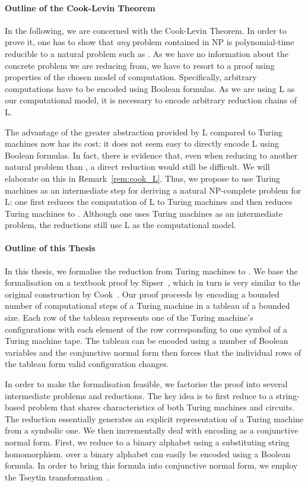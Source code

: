 \paragraph{Outline of the Cook-Levin Theorem}
In the following, we are concerned with the Cook-Levin Theorem.
In order to prove it, one has to show that \emph{any} problem contained in NP is polynomial-time reducible to a natural problem such as \SAT{}. 
As we have no information about the concrete problem we are reducing from, we have to resort to a proof using properties of the chosen model of computation. 
Specifically, arbitrary computations have to be encoded using Boolean formulas.
As we are using L as our computational model, it is necessary to encode arbitrary reduction chains of L. 

The advantage of the greater abstraction provided by L compared to Turing machines now has its cost: it does not seem easy to directly encode L using Boolean formulas. In fact, there is evidence that, even when reducing to another natural problem than \SAT{}, a direct reduction would still be difficult. We will elaborate on this in Remark~\ref{rem:cook_L}.
Thus, we propose to use Turing machines as an intermediate step for deriving a natural NP-complete problem for L\@: one first reduces the computation of L to Turing machines and then reduces Turing machines to \SAT{}. Although one uses Turing machines as an intermediate problem, the reductions still use L as the computational model.

\paragraph{Outline of this Thesis}
In this thesis, we formalise the reduction from Turing machines to \SAT{}. We base the formalisation on a textbook proof by Sipser~\cite{Sipser:TheoryofComputation}, which in turn is very similar to the original construction by Cook~\cite{cook_theorem}. Our proof proceeds by encoding a bounded number of computational steps of a Turing machine in a tableau of a bounded size. 
Each row of the tableau represents one of the Turing machine's configurations with each element of the row corresponding to one symbol of a Turing machine tape. The tableau can be encoded using a number of Boolean variables and the conjunctive normal form then forces that the individual rows of the tableau form valid configuration changes.

In order to make the formalisation feasible, we factorise the proof into several intermediate problems and reductions. The key idea is to first reduce to a string-based problem \PR{} that shares characteristics of both Turing machines and circuits. 
The reduction essentially generates an explicit representation of a Turing machine from a symbolic one.
We then incrementally deal with encoding \PR{} as a conjunctive normal form. First, we reduce to a binary alphabet using a substituting string homomorphism. 
\PR{} over a binary alphabet can easily be encoded using a Boolean formula. In order to bring this formula into conjunctive normal form, we employ the Tseytin transformation~\cite{Tseitin1983}.


